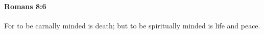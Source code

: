 		\paragraph{Romans 8:6} %
			\label{ROMANS-8-6}

			For to be carnally minded is death; but to be spiritually minded is life and peace.

			\begin{framed}
			\scriptsize
				\begin{compactdesc}
					\item[SBLG] \footnotemark {}
				\end{compactdesc}
			\end{framed}
